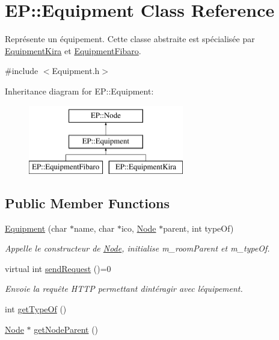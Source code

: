 \hypertarget{class_e_p_1_1_equipment}{}\section{EP\+:\+:Equipment Class Reference}
\label{class_e_p_1_1_equipment}


Représente un équipement. Cette classe abstraite est spécialisée par \hyperlink{class_e_p_1_1_equipment_kira}{Equipment\+Kira} et \hyperlink{class_e_p_1_1_equipment_fibaro}{Equipment\+Fibaro}.  




{\ttfamily \#include $<$Equipment.\+h$>$}

Inheritance diagram for EP\+:\+:Equipment\+:\begin{figure}[H]
\begin{center}
\leavevmode
\includegraphics[height=3.000000cm]{class_e_p_1_1_equipment}
\end{center}
\end{figure}
\subsection*{Public Member Functions}
\begin{DoxyCompactItemize}
\item 
\hyperlink{class_e_p_1_1_equipment_a7fce8df2fed82ae05a50f1489307e2ae}{Equipment} (char $\ast$name, char $\ast$ico, \hyperlink{class_e_p_1_1_node}{Node} $\ast$parent, int type\+Of)
\begin{DoxyCompactList}\small\item\em Appelle le constructeur de \hyperlink{class_e_p_1_1_node}{Node}, initialise m\+\_\+room\+Parent et m\+\_\+type\+Of. \end{DoxyCompactList}\item 
virtual int \hyperlink{class_e_p_1_1_equipment_ab95a169fa00d4b7408bf30320f5b7ad8}{send\+Request} ()=0\hypertarget{class_e_p_1_1_equipment_ab95a169fa00d4b7408bf30320f5b7ad8}{}\label{class_e_p_1_1_equipment_ab95a169fa00d4b7408bf30320f5b7ad8}

\begin{DoxyCompactList}\small\item\em Envoie la requête H\+T\+TP permettant d\textquotesingle{}intéragir avec l\textquotesingle{}équipement. \end{DoxyCompactList}\item 
int \hyperlink{class_e_p_1_1_equipment_aac7c97005aec719e51483c9719386015}{get\+Type\+Of} ()
\item 
\hyperlink{class_e_p_1_1_node}{Node} $\ast$ \hyperlink{class_e_p_1_1_equipment_a4a65e982a7ca98587344786d57745b22}{get\+Node\+Parent} ()
\end{DoxyCompactItemize}
